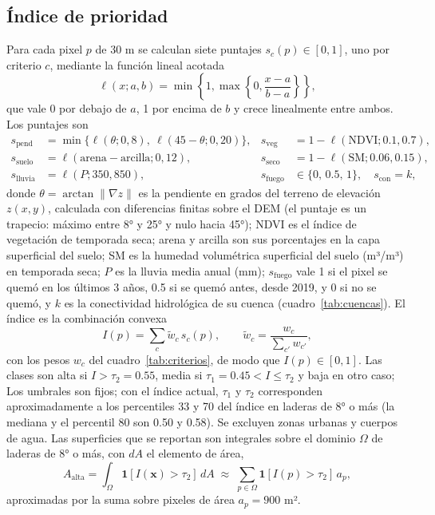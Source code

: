 \documentclass[11pt,letterpaper]{article}
\begin{document}
\subsection{Índice de prioridad}

Para cada pixel $p$ de 30 m se calculan siete puntajes $s_c(p)\in[0,1]$, uno por criterio $c$, mediante la función lineal acotada
\begin{equation}
\ell(x;a,b)=\min\left\{1,\max\left\{0,\frac{x-a}{b-a}\right\}\right\},
\end{equation}
que vale 0 por debajo de $a$, 1 por encima de $b$ y crece linealmente entre ambos. Los puntajes son
\begin{equation}
\begin{aligned}
s_{\text{pend}} &= \min\{\ell(\theta;0,8),\ \ell(45-\theta;0,20)\}, &
s_{\text{veg}} &= 1-\ell(\text{NDVI};0.1,0.7),\\
s_{\text{suelo}} &= \ell(\text{arena}-\text{arcilla};0,12), &
s_{\text{seco}} &= 1-\ell(\text{SM};0.06,0.15),\\
s_{\text{lluvia}} &= \ell(P;350,850), &
s_{\text{fuego}} &\in\{0,\,0.5,\,1\},\quad s_{\text{con}}=k,
\end{aligned}
\end{equation}
donde $\theta=\arctan\lVert\nabla z\rVert$ es la pendiente en grados del terreno de elevación $z(x,y)$, calculada con diferencias finitas sobre el DEM (el puntaje es un trapecio: máximo entre 8° y 25° y nulo hacia 45°); NDVI es el índice de vegetación de temporada seca; arena y arcilla son sus porcentajes en la capa superficial del suelo; SM es la humedad volumétrica superficial del suelo (m³/m³) en temporada seca; $P$ es la lluvia media anual (mm); $s_{\text{fuego}}$ vale 1 si el pixel se quemó en los últimos 3 años, 0.5 si se quemó antes, desde 2019, y 0 si no se quemó, y $k$ es la conectividad hidrológica de su cuenca (cuadro~\ref{tab:cuencas}). El índice es la combinación convexa
\begin{equation}
I(p)=\sum_c \tilde w_c\, s_c(p),\qquad \tilde w_c = \frac{w_c}{\sum_{c'} w_{c'}},
\end{equation}
con los pesos $w_c$ del cuadro~\ref{tab:criterios}, de modo que $I(p)\in[0,1]$. Las clases son alta si $I>\tau_2=0.55$, media si $\tau_1=0.45<I\le\tau_2$ y baja en otro caso; Los umbrales son fijos; con el índice actual, $\tau_1$ y $\tau_2$ corresponden aproximadamente a los percentiles 33 y 70 del índice en laderas de 8° o más (la mediana y el percentil 80 son 0.50 y 0.58). Se excluyen zonas urbanas y cuerpos de agua. Las superficies que se reportan son integrales sobre el dominio $\Omega$ de laderas de 8° o más, con $dA$ el elemento de área,
\begin{equation}
A_{\text{alta}}=\int_{\Omega}\mathbf 1\!\left[I(\mathbf x)>\tau_2\right]\,dA \;\approx\; \sum_{p\in\Omega}\mathbf 1\!\left[I(p)>\tau_2\right]\,a_p ,
\end{equation}
aproximadas por la suma sobre pixeles de área $a_p=900$ m².
\end{document}
